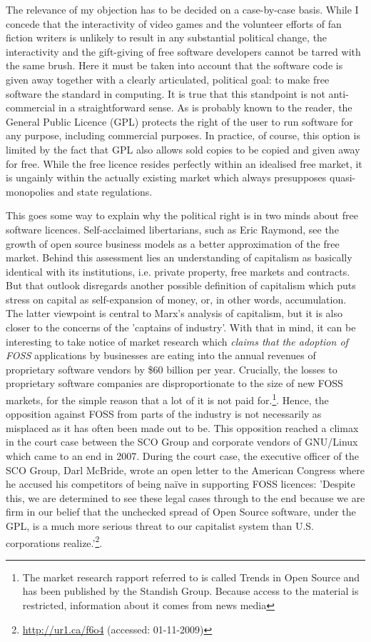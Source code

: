The relevance of my objection has to be decided on a case-by-case basis. While I
concede that the interactivity of video games and the volunteer ef\hbox{}forts of fan
f\hbox{}iction writers is unlikely to result in any substantial political change, the
interactivity and the gift-giving of free software developers cannot be tarred
with the same brush. Here it must be taken into account that the software code
is given away together with a clearly articulated, political goal: to make free
software the standard in computing. It is true that this standpoint is not
anti-commercial in a straightforward sense. As is probably known to the reader,
the General Public Licence (GPL) protects the right of the user to run software
for any purpose, including commercial purposes\cite{gnunited-gay02}. In
practice, of course, this option is limited by the fact that GPL also allows
sold copies to be copied and given away for free. While the free licence resides
perfectly within an idealised free market, it is ungainly within the actually
existing market which always presupposes quasi-monopolies and state
regulations\cite{gnunited-polanyi01}.

This goes some way to explain why the political right is in two minds about free
software licences. Self-acclaimed libertarians, such as Eric Raymond, see the
growth of open source business models as a better approximation of the free
market. Behind this assessment lies an understanding of capitalism as basically
identical with its institutions, i.e. private property, free markets and
contracts. But that outlook disregards another possible def\hbox{}inition of
capitalism which puts stress on capital as self-expansion of money, or, in other
words, accumulation. The latter viewpoint is central to Marx's analysis of
capitalism, but it is also closer to the concerns of the 'captains of industry'.
With that in mind, it can be interesting to take notice of market research which
\textit{claims that the adoption of FOSS} applications by businesses are eating
into the annual revenues of proprietary software vendors by \$60 billion per
year. Crucially, the losses to proprietary software companies are
disproportionate to the size of new FOSS markets, for the simple reason that a
lot of it is not paid for.\footnote{The market research rapport referred to is
called Trends in Open Source and has been published by the Standish Group.
Because access to the material is restricted, information about it comes from
news media\cite{gnunited-broersma08}}. Hence, the opposition against FOSS from
parts of the industry is not necessarily as misplaced as it has often been made
out to be. This opposition reached a climax in the court case between the SCO
Group and corporate vendors of GNU/Linux which came to an end in 2007.  During
the court case, the executive of\hbox{}f\hbox{}icer of the SCO Group, Darl
McBride, wrote an open letter to the American Congress where he accused his
competitors of being naïve in supporting FOSS licences: 'Despite this, we are
determined to see these legal cases through to the end because we are
f\hbox{}irm in our belief that the unchecked spread of Open Source software,
under the GPL, is a much more serious threat to our capitalist system than U.S.
corporations realize.'\footnote{\url{http://ur1.ca/f6o4} (accessed:
01-11-2009)}.


